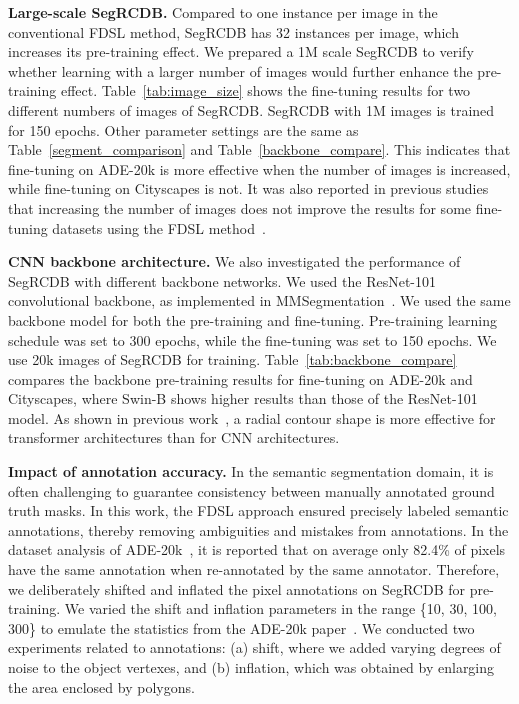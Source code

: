 \documentclass[10pt,twocolumn,letterpaper]{article}
\begin{document}
\noindent \textbf{Large-scale SegRCDB.}
Compared to one instance per image in the conventional FDSL method, SegRCDB has 32 instances per image, which increases its pre-training effect.
We prepared a 1M scale SegRCDB to verify whether learning with a larger number of images would further enhance the pre-training effect.
Table~\ref{tab:image_size} shows the fine-tuning results for two different numbers of images of SegRCDB. SegRCDB with 1M images is trained for 150 epochs.  Other parameter settings are the same as Table~\ref{segment_comparison} and Table~\ref{backbone_compare}.
This indicates that fine-tuning on ADE-20k is more effective when the number of images is increased, while fine-tuning on Cityscapes is not.
It was also reported in previous studies that increasing the number of images does not improve the results for some fine-tuning datasets using the FDSL method~\cite{Kataoka_2022_CVPR, nakashima2022can}.

\noindent \textbf{CNN backbone architecture.}
We also investigated the performance of SegRCDB with different backbone networks. 
We used the ResNet-101~\cite{HeCVPR2016} convolutional backbone, as implemented in MMSegmentation~\cite{mmseg2020}. We used the same backbone model for both the pre-training and fine-tuning. Pre-training learning schedule was set to 300 epochs, while the fine-tuning was set to 150 epochs. We use 20k images of SegRCDB for training. Table~\ref{tab:backbone_compare} compares the backbone pre-training results for fine-tuning on ADE-20k and Cityscapes, where Swin-B shows higher results than those of the ResNet-101 model. As shown in previous work~\cite{Kataoka_2022_CVPR}, a radial contour shape is more effective for transformer architectures than for CNN architectures.

\noindent \textbf{Impact of annotation accuracy.}
In the semantic segmentation domain, it is often challenging to guarantee consistency between manually annotated ground truth masks. In this work, the FDSL approach ensured precisely labeled semantic annotations, thereby removing ambiguities and mistakes from annotations. In the dataset analysis of ADE-20k~\cite{zhou2017scene}, it is reported that on average only 82.4\% of pixels have the same annotation when re-annotated by the same annotator. Therefore, we deliberately shifted and inflated the pixel annotations on SegRCDB for pre-training. We varied the shift and inflation parameters in the range \{10, 30, 100, 300\} to emulate the statistics from the ADE-20k paper~\cite{zhou2017scene}. 
We conducted two experiments related to annotations: (a) shift, where we added varying degrees of noise to the object vertexes, and (b) inflation, which was obtained by enlarging the area enclosed by polygons.
\end{document}
